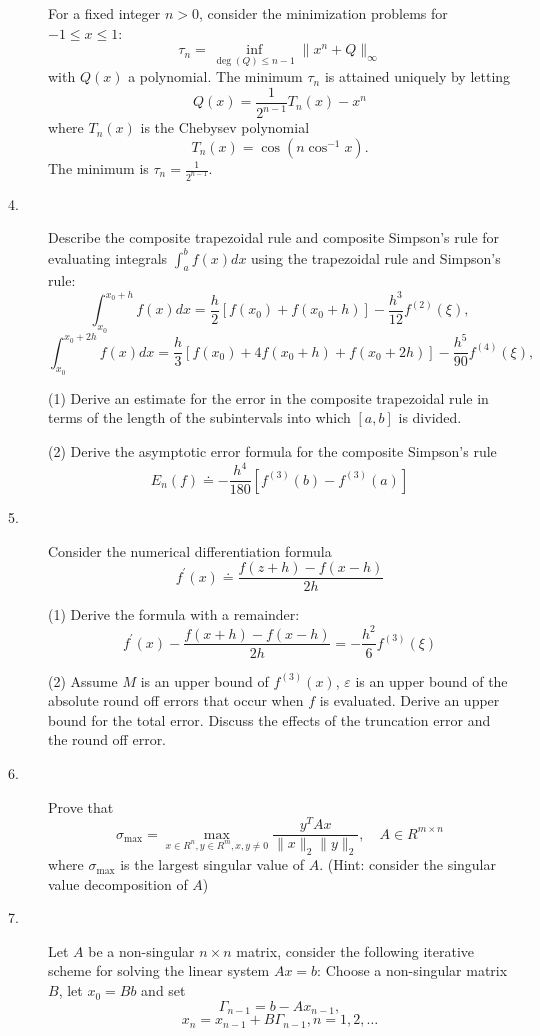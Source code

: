 \documentclass{article}
\begin{document}
\begin{description}
For a fixed integer $n>0$, consider the minimization problems for
$-1 \leq x \leq 1$:
$$\tau_n = \inf_{\deg (Q) \leq n-1} \parallel x^n + Q \parallel_\infty$$
with $Q(x)$ a polynomial. The minimum $\tau_n$ is attained uniquely
by letting
$$Q(x) = \frac{1}{2^{n-1}} T_n (x) - x^n$$
where $T_n(x)$ is the Chebysev polynomial
$$T_n(x) = \cos(n \cos^{-1} x).$$
The minimum is $\tau_n = \frac{1}{2^{n-1}}$.

\item[4.]
Describe the composite trapezoidal rule and composite Simpson's rule for
evaluating integrals $\int^b_a f(x) dx$ using the trapezoidal rule and
Simpson's rule:
$$\int^{x_0 +h}_{x_0} f(x) dx = \frac{h}{2} \left[ f(x_0) + f(x_0 + h) \right]
  - \frac{h^3}{12} f^{(2)} (\xi),$$
$$\int^{x_0 + 2h}_{x_0} f(x) dx = \frac{h}{3} \left[ f(x_0) + 4f (x_0 + h) +
  f(x_0 + 2h) \right] - \frac{h^5}{90} f^{(4)} (\xi),$$

\item[\quad] (1)
Derive an estimate for the error in the composite trapezoidal rule in terms
of the length of the subintervals into which $[a,b]$ is divided.

\item[\quad] (2)
Derive the asymptotic error formula for the composite Simpson's rule
$$E_n (f) \doteq - \frac{h^4}{180} \left[ f^{(3)} (b) - f^{(3)} (a) \right]$$

\item[5.]
Consider the numerical differentiation formula
$$f^\prime (x) \doteq \frac{f(z+h) - f(x-h)}{2h}$$

\item[\quad] (1)
Derive the formula with a remainder:
$$f^\prime (x) - \frac{f(x+h) - f(x-h)}{2h} = -\frac{h^2}{6} f^{(3)} (\xi)$$

\item[\quad] (2)
Assume $M$ is an upper bound of $f^{(3)} (x)$, $\varepsilon$ is an upper
bound of the absolute round off errors that occur when $f$ is evaluated.
Derive an upper bound for the total error. Discuss the effects of the
truncation error and the round off error.

\item[6.]
Prove that
$$\sigma_{\max} = \max_{x \in R^n, y \in R^m, x, y \neq 0}
  \frac{y^T Ax}{\parallel x \parallel_2 \parallel y \parallel_2}, \quad
  A \in R^{m \times n}$$
where $\sigma_{\max}$ is the largest singular value of $A$. (Hint: consider
the singular value decomposition of $A$)

\item[7.]
Let $A$ be a non-singular $n \times n$ matrix, consider the following
iterative scheme for solving the linear system $Ax=b$: Choose a non-singular
matrix $B$, let $x_0 = Bb$ and set
$$\Gamma_{n-1} = b - Ax_{n-1},$$
$$x_n = x_{n-1} + B \Gamma_{n-1}, n= 1,2,\dots$$


\end{description}
\end{document}
